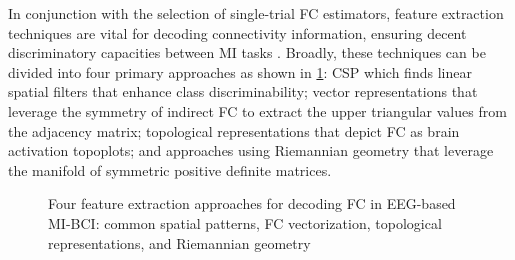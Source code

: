 In conjunction with the selection of single-trial FC estimators, feature extraction techniques are vital for decoding connectivity information, ensuring decent discriminatory capacities between MI tasks \cite{ai2019feature}. Broadly, these techniques can be divided into four primary approaches as shown in \cref{fig:sota1_FE}: CSP which finds linear spatial filters that enhance class discriminability; vector representations that leverage the symmetry of indirect FC to extract the upper triangular values from the adjacency matrix; topological representations that depict FC as brain activation topoplots; and approaches using Riemannian geometry that leverage the manifold of symmetric positive definite matrices.

\begin{figure}[h!]
    \centering
        \caption{Four feature extraction approaches for decoding FC in EEG-based MI-BCI: common spatial patterns, FC vectorization, topological representations, and Riemannian geometry \label{fig:sota1_FE}}

\end{figure}

